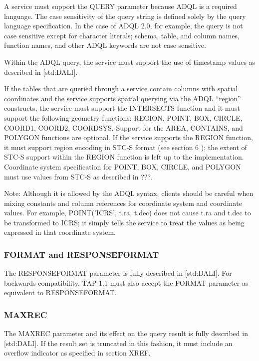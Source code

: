 \documentclass[11pt,letter]{ivoa}
\begin{document}
A service must support the QUERY parameter because ADQL is a required language.  
The case sensitivity of the query string is defined solely by the query language 
specification. In the case of ADQL 2.0, for example, the query is not case 
sensitive except for character  literals; schema, table, and column names, 
function names, and other ADQL keywords are not case sensitive.

Within the ADQL query, the service must support the use of timestamp values as 
described in [std:DALI].

If the tables that are queried through a service contain columns with spatial 
coordinates and the service supports spatial querying via the ADQL “region” 
constructs, the service must support the INTERSECTS function and it must support 
the following geometry functions: REGION, POINT, BOX, CIRCLE, COORD1, COORD2, 
COORDSYS. Support for the AREA, CONTAINS, and POLYGON functions are optional. If 
the service supports the REGION function, it must support region encoding in 
STC-S format (see section 6 ); the extent of STC-S support within the REGION 
function is left up to the implementation. Coordinate system specification for 
POINT, BOX, CIRCLE, and POLYGON must use values from STC-S as described in ???.

Note: Although it is allowed by the ADQL syntax, clients should be careful when 
mixing constants and column references for coordinate system and coordinate 
values. For example, POINT('ICRS', t.ra, t.dec) does not cause t.ra and t.dec to 
be transformed to ICRS; it simply tells the service to treat the values  as 
being expressed in that coordinate system.

\subsubsection{FORMAT and RESPONSEFORMAT}
\label{sec:RESPONSEFORMAT}

The RESPONSEFORMAT parameter is fully described in [std:DALI]. For backwards 
compatibility, TAP-1.1 must also accept the FORMAT parameter as equivalent to 
RESPONSEFORMAT.

\subsubsection{MAXREC}
\label{sec:MAXREC}

The MAXREC parameter and its effect on the query result is fully described in 
[std:DALI]. If the result set is truncated in this fashion, it must include an 
overflow indicator as specified in section XREF.
\end{document}
